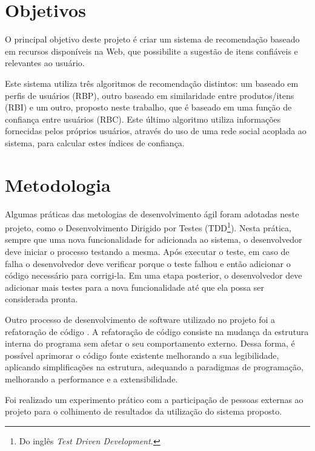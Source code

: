 

\section{Objetivos} %
\label{sec:objetivos}

 O principal objetivo deste projeto é criar um sistema de recomendação baseado em recursos disponíveis na Web, que possibilite a sugestão de itens confiáveis e relevantes ao usuário.

 Este sistema utiliza três algoritmos de recomendação distintos: um baseado em perfis de usuários (RBP), outro baseado em similaridade entre produtos/itens (RBI) e um outro, proposto neste trabalho, que é baseado em uma função de confiança entre usuários (RBC). Este último algoritmo utiliza informações fornecidas pelos próprios usuários, através do uso de uma rede social acoplada ao sistema, para calcular estes índices de confiança.


\section{Metodologia} %
\label{sec:metodologia}

  Algumas práticas das metologias de desenvolvimento ágil foram adotadas neste projeto, como o Desenvolvimento Dirigido por Testes (TDD\footnote{Do inglês \textit{Test Driven Development.}}). Nesta prática, sempre que uma nova funcionalidade for adicionada ao sistema, o desenvolvedor deve iniciar o processo testando a mesma. Após executar o teste, em caso de falha o desenvolvedor deve verificar porque o teste falhou e então adicionar o código necessário para corrigi-la. Em uma etapa posterior, o desenvolvedor deve adicionar mais testes para a nova funcionalidade até que ela possa ser considerada pronta.
 
 Outro processo de desenvolvimento de software utilizado no projeto foi a refatoração de código \cite{fowler1999refactoring}. A refatoração de código consiste na mudança da estrutura interna do programa sem afetar o seu comportamento externo. Dessa forma, é possível aprimorar o código fonte existente melhorando a sua legibilidade, aplicando simplificações na estrutura, adequando a paradigmas de programação, melhorando a performance e a extensibilidade.
 
 Foi realizado um experimento prático com a participação de pessoas externas ao projeto para o colhimento de resultados da utilização do sistema proposto.

